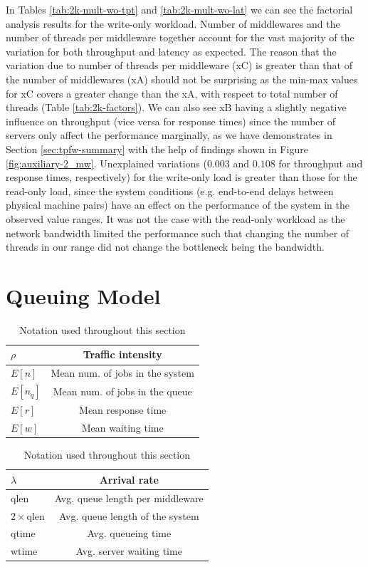 \documentclass[11pt,a4paper]{article}
\begin{document}
\par In Tables \ref{tab:2k-mult-wo-tpt} and \ref{tab:2k-mult-wo-lat} we can see the factorial analysis results for the write-only workload. Number of middlewares and the number of threads per middleware together account for the vast majority of the variation for both throughput and latency as expected. The reason that the variation due to number of threads per middleware (xC) is greater than that of the number of middlewares (xA) should not be surprising as the min-max values for xC covers a greater change than the xA, with respect to total number of threads (Table \ref{tab:2k-factors}). We can also see xB having a slightly negative influence on throughput (vice versa for response times) since the number of servers only affect the performance marginally, as we have demonstrates in Section \ref{sec:tpfw-summary} with the help of findings shown in Figure \ref{fig:auxiliary-2_mw}. Unexplained variations ($0.003$ and $0.108$ for throughput and response times, respectively) for the write-only load is greater than those for the read-only load, since the system conditions (e.g. end-to-end delays between physical machine pairs) have an effect on the performance of the system in the observed value ranges. It was not the case with the read-only workload as the network bandwidth limited the performance such that changing the number of threads in our range did not change the bottleneck being the bandwidth.

\section{Queuing Model} \label{sec:queueing-model}
\begin{table}[h]
\begin{minipage}{.5\textwidth}
	\centering
	\begin{tabular}{|l|c|}
		\hline $\rho$		& Traffic intensity					\\
		\hline $E[n]$		& Mean num. of jobs in the system	\\
		\hline $E[n_{q}]$	& Mean num. of jobs in the queue 	\\
		\hline $E[r]$		& Mean response time					\\
		\hline $E[w]$		& Mean waiting time					\\
		\hline 
	\end{tabular}
\end{minipage}%
\begin{minipage}{.5\textwidth}
	\centering
	\begin{tabular}{|l|c|}
		\hline $\lambda$		& Arrival rate						\\
		\hline qlen			& Avg. queue length per middleware	\\
		\hline $2\times$qlen	& Avg. queue length of the system	\\
		\hline qtime			& Avg. queueing time					\\
		\hline wtime			& Avg. server waiting time			\\
		\hline 
	\end{tabular}
\end{minipage}
\caption{Notation used throughout this section} \label{tab:queueing-notation}
\end{table}	
\end{document}
